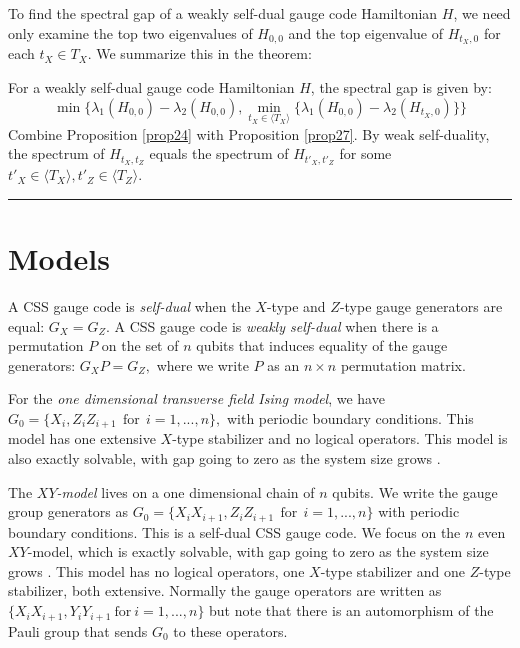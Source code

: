 \documentclass[11pt,oneside]{article}
\def\Span#1{\langle #1 \rangle}
\newcommand\dotheorem[1]{\vskip 5pt \noindent {\bf \underline{Theorem #1.}\ }}
\newcommand\doproof{\vskip 5pt \noindent{\bf \underline{Proof:}\ }}
\newcommand\tombstone{\rule{.36em}{2ex}\vskip 5pt}
\newcounter{numitem}
\newcommand{\numitem}[1]{\refstepcounter{numitem}\thenumitem\label{#1}}
\begin{document}
To find the spectral gap of a weakly self-dual gauge code Hamiltonian $H$,
we need only examine the top two eigenvalues of $H_{0,0}$ and 
the top eigenvalue of $H_{t_X,0}$ for each $t_X\in T_X.$ 
We summarize this in the theorem:

\dotheorem{\numitem{thm28}}
For a weakly self-dual gauge code Hamiltonian $H$,
the spectral gap is given by:
$$
    \min \bigl\{ \lambda_1(H_{0,0}) - \lambda_2(H_{0,0}),
        \min_{t_X\in\Span{T_X}} 
         \{ \lambda_1(H_{0,0}) - \lambda_2(H_{t_X,0}) \} \bigr\}
$$
\doproof
Combine Proposition \ref{prop24} with Proposition \ref{prop27}.
By weak self-duality, the spectrum of $H_{t_X,t_Z}$ equals
the spectrum of $H_{t'_X,t'_Z}$ for some 
$t'_X\in\Span{T_X}, t'_Z\in\Span{T_Z}.$
\tombstone


%

\section{Models}\label{Sec4}

A CSS gauge code is \emph{self-dual} when the $X$-type and $Z$-type
gauge generators are equal: $G_X = G_Z.$
A CSS gauge code is \emph{weakly self-dual}
when there is a permutation $P$ on the set of $n$ qubits
that induces equality of the gauge generators:
$
    G_X P = G_Z,
$
where we write $P$ as an $n\times n$ permutation matrix.


For the \emph{one dimensional transverse field Ising model},
we have 
$ G_0 = \{ X_i, Z_i Z_{i+1}\ \ \mbox{for}\ \ i=1,...,n \}, $
with periodic boundary conditions.
This model has one extensive 
$X$-type stabilizer and no logical operators.
This model is also exactly solvable, with gap going to zero
as the system size grows \cite{Pfeuty1970}.


The \emph{$XY$-model} \cite{Pfeuty1970}
lives on a one dimensional chain of $n$ qubits.
We write the gauge group generators as
$
    G_0 = \{ X_i X_{i+1}, Z_i Z_{i+1}\ \ \mbox{for}\ \ i=1,...,n \}
$
with periodic boundary conditions.
This is a self-dual CSS gauge code.
We focus on the $n$ even $XY$-model,
which is exactly solvable,
with gap going to zero as the system size grows \cite{Lieb1961}.
This model has no logical operators, one 
$X$-type stabilizer and one $Z$-type stabilizer,
both extensive.
Normally the gauge operators are written as 
$\{ X_i X_{i+1}, Y_i Y_{i+1} \ \mbox{for}\ i=1,...,n \}$
but note that there is an automorphism of the Pauli group
that sends $G_0$ to these operators.
\end{document}

